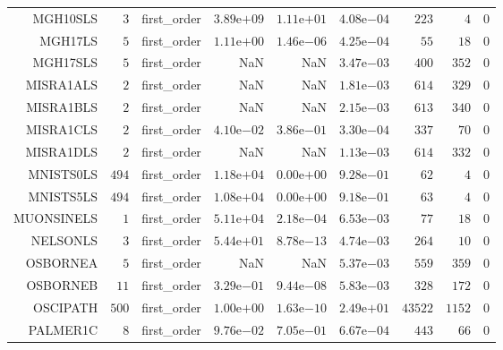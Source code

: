 \begin{longtable}{rrrrrrrrr}
MGH10SLS & \(     3\) & first\_order & \( 3.89\)e\(+09\) & \( 1.11\)e\(+01\) & \( 4.08\)e\(-04\) & \(   223\) & \(     4\) & \(     0\) \\
MGH17LS & \(     5\) & first\_order & \( 1.11\)e\(+00\) & \( 1.46\)e\(-06\) & \( 4.25\)e\(-04\) & \(    55\) & \(    18\) & \(     0\) \\
MGH17SLS & \(     5\) & first\_order &       NaN &       NaN & \( 3.47\)e\(-03\) & \(   400\) & \(   352\) & \(     0\) \\
MISRA1ALS & \(     2\) & first\_order &       NaN &       NaN & \( 1.81\)e\(-03\) & \(   614\) & \(   329\) & \(     0\) \\
MISRA1BLS & \(     2\) & first\_order &       NaN &       NaN & \( 2.15\)e\(-03\) & \(   613\) & \(   340\) & \(     0\) \\
MISRA1CLS & \(     2\) & first\_order & \( 4.10\)e\(-02\) & \( 3.86\)e\(-01\) & \( 3.30\)e\(-04\) & \(   337\) & \(    70\) & \(     0\) \\
MISRA1DLS & \(     2\) & first\_order &       NaN &       NaN & \( 1.13\)e\(-03\) & \(   614\) & \(   332\) & \(     0\) \\
MNISTS0LS & \(   494\) & first\_order & \( 1.18\)e\(+04\) & \( 0.00\)e\(+00\) & \( 9.28\)e\(-01\) & \(    62\) & \(     4\) & \(     0\) \\
MNISTS5LS & \(   494\) & first\_order & \( 1.08\)e\(+04\) & \( 0.00\)e\(+00\) & \( 9.18\)e\(-01\) & \(    63\) & \(     4\) & \(     0\) \\
MUONSINELS & \(     1\) & first\_order & \( 5.11\)e\(+04\) & \( 2.18\)e\(-04\) & \( 6.53\)e\(-03\) & \(    77\) & \(    18\) & \(     0\) \\
NELSONLS & \(     3\) & first\_order & \( 5.44\)e\(+01\) & \( 8.78\)e\(-13\) & \( 4.74\)e\(-03\) & \(   264\) & \(    10\) & \(     0\) \\
OSBORNEA & \(     5\) & first\_order &       NaN &       NaN & \( 5.37\)e\(-03\) & \(   559\) & \(   359\) & \(     0\) \\
OSBORNEB & \(    11\) & first\_order & \( 3.29\)e\(-01\) & \( 9.44\)e\(-08\) & \( 5.83\)e\(-03\) & \(   328\) & \(   172\) & \(     0\) \\
OSCIPATH & \(   500\) & first\_order & \( 1.00\)e\(+00\) & \( 1.63\)e\(-10\) & \( 2.49\)e\(+01\) & \( 43522\) & \(  1152\) & \(     0\) \\
PALMER1C & \(     8\) & first\_order & \( 9.76\)e\(-02\) & \( 7.05\)e\(-01\) & \( 6.67\)e\(-04\) & \(   443\) & \(    66\) & \(     0\) \\

\end{longtable}
